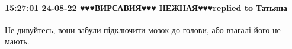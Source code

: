  
 
 
 
 

\paragraph{15:27:01 24-08-22 ♥♥♥ВИРСАВИЯ♥♥♥ НЕЖНАЯ♥♥♥replied to Татьяна}

Не дивуйтесь, вони забули підключити мозок до голови, або взагалі його не
мають.
